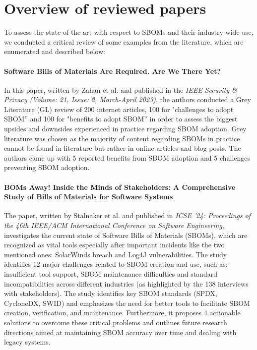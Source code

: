 \section{Overview of reviewed papers}

To assess the state-of-the-art with respect to SBOMs and their industry-wide use, we conducted a critical review of some examples from the literature, which are enumerated and described below:

\paragraph{Software Bills of Materials Are Required. Are We There Yet?} \cite{article:sbom-required} In this paper, written by Zahan et al. and published in the \emph{IEEE Security \& Privacy (Volume: 21, Issue: 2, March-April 2023)}, the authors conducted a Grey Literature (GL) review of 200 internet articles, 100 for "challenges to adopt SBOM” and 100 for "benefits to adopt SBOM” in order to assess the biggest upsides and downsides experienced in practice regarding SBOM adoption. Grey literature was chosen as the majority of content regarding SBOMs in practice cannot be found in literature but rather in online articles and blog posts. The authors came up with 5 reported benefits from SBOM adoption and 5 challenges preventing SBOM adoption.

\paragraph{BOMs Away! Inside the Minds of Stakeholders: A Comprehensive Study of Bills of Materials for Software Systems} \cite{article:software-bom} The paper, written by Stalnaker et al. and published in \emph{ICSE '24: Proceedings of the 46th IEEE/ACM International Conference on Software Engineering}, investigates the current state of Software Bills of Materials (SBOMs), which are recognized as vital tools especially after important incidents like the two mentioned ones: SolarWinds breach and Log4J vulnerabilities. The study identifies 12 major challenges related to SBOM creation and use, such as: insufficient tool support, SBOM maintenance difficulties and standard incompatibilities across different industries (as highlighted by the 138 interviews with stakeholders). The study identifies key SBOM standards (SPDX, CycloneDX, SWID) and emphasizes the need for better tools to facilitate SBOM creation, verification, and maintenance. Furthermore, it proposes 4 actionable solutions to overcome these critical problems and outlines future research directions aimed at maintaining SBOM accuracy over time and dealing with legacy systems.

